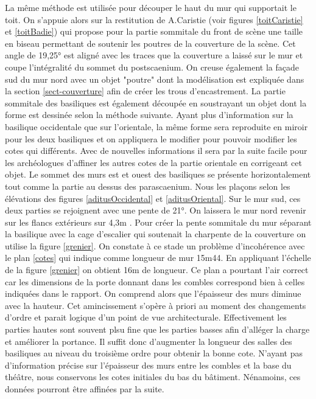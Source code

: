 La même méthode est utilisée pour découper le haut du mur qui supportait le toit. On s'appuie alors sur la restitution de A.Caristie (voir figures \ref{toitCaristie} et \ref{toitBadie}) qui propose pour la partie sommitale du front de scène une taille en biseau permettant de soutenir les poutres de la couverture de la scène. Cet angle de 19,25° est aligné avec les traces que la couverture a laissé sur le mur et coupe l'intégralité du sommet du \gls{postscaenium}. On creuse également la façade sud du mur nord avec un objet "poutre" dont la modélisation est expliquée dans la section \ref{sect-couverture} afin de créer les trous d'encastrement. La partie sommitale des basiliques est également découpée en soustrayant un objet dont la forme est dessinée selon la méthode suivante. Ayant plus d'information sur la basilique occidentale que sur l'orientale, la même forme sera reproduite en miroir pour les deux basiliques et on appliquera le modifier pour pouvoir modifier les cotes qui différents. Avec de nouvelles informations il sera par la suite facile pour les archéologues d'affiner les autres cotes de la partie orientale en corrigeant cet objet. Le sommet des murs est et ouest des basiliques se présente horizontalement tout comme la partie au dessus des \gls{parascaenium}. Nous les plaçons selon les élévations des figures \ref{aditusOccidental} et \ref{aditusOriental}. Sur le mur sud, ces deux parties se rejoignent avec une pente de 21°. On laissera le mur nord revenir sur les flancs extérieurs sur 4,3m \cite[p. 38]{orangeTxt}. Pour créer la pente sommitale du mur séparant la basilique avec la cage d'escalier qui soutenait la charpente de la couverture on utilise la figure \ref{grenier}. On constate à ce stade un problème d'incohérence avec le plan \ref{cotes} qui indique comme longueur de mur 15m44. En appliquant l'échelle de la figure \ref{grenier} on obtient 16m de longueur. Ce plan a pourtant l'air correct car les dimensions de la porte donnant dans les combles correspond bien à celles indiquées dans le rapport. On comprend alors que l'épaisseur des murs diminue avec la hauteur. Cet amincissement s'opère à priori au moment des changements d'ordre et parait logique d'un point de vue architecturale. Effectivement les parties hautes sont souvent plsu fine que les parties basses afin d'alléger la charge et améliorer la portance. Il suffit donc d'augmenter la longueur des salles des basiliques au niveau du troisième ordre pour obtenir la bonne cote. N'ayant pas d'information précise sur l'épaisseur des murs entre les combles et la base du théâtre, nous conservons les cotes initiales du bas du bâtiment. Nénamoins, ces données pourront être affinées par la suite.

